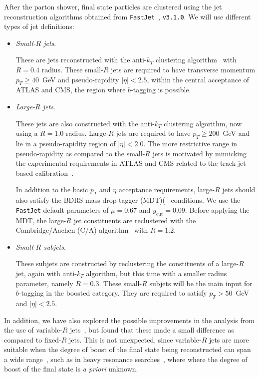 After the  parton shower, final state particles
are clustered using the
jet reconstruction algorithms
obtained from
{\tt FastJet}~\cite{Cacciari:2011ma,Cacciari:2005hq},
{\tt v3.1.0}.
%
We will use different types of jet definitions:
\begin{itemize}
\item {\it Small-$R$ jets}.

  These are jets  reconstructed with the
  anti-$k_T$ clustering algorithm~\cite{Cacciari:2008gp} with $R=0.4$ radius.
  These small-$R$ jets are required
  to have transverse momentum $p_T \ge 40$~GeV
  and pseudo-rapidity $|\eta|<2.5$, within the central 
  acceptance of ATLAS and CMS, the region
  where $b$-tagging is possible.

\item {\it Large-$R$ jets}.

  These jets are also constructed with the
  anti-$k_T$ clustering algorithm, now using a $R=1.0$ radius.
  Large-$R$ jets are required to have
  $p_T \ge 200$~GeV and lie in a pseudo-rapidity region of
  $|\eta|<2.0$.
  The more restrictive range  in pseudo-rapidity
  as compared to the small-$R$ jets
  is motivated by mimicking the  experimental requirements
  in ATLAS and CMS
  related to the track-jet based calibration~\cite{Aad:2014bia,ATLAS:2012kla}.

  In addition to the basic $p_T$ and $\eta$
  acceptance requirements, large-$R$ jets should also
  satisfy the  BDRS mass-drop tagger (MDT)(~\cite{Butterworth:2008iy}
  conditions.
  We use the {\tt FastJet} default
  parameters of  $\mu = 0.67$ and $y_{\textrm{cut}}= 0.09$.
  Before applying the MDT, the large-$R$ jet
  constituents are reclustered with the Cambridge/Aachen (C/A)
  algorithm~\cite{Dokshitzer:1997in,Wobisch:1998wt}
  with $R=1.2$.

  
\item {\it Small-$R$ subjets}.

  These subjets are constructed by reclustering the constituents
  of a large-$R$ jet, again with  anti-$k_T$ algorithm,
  but this time with a smaller radius parameter, namely
  $R=0.3$.
  These small-$R$ subjets will be the main input for
  $b$-tagging in the boosted category.
  They are required to satisfy $p_T > 50$~GeV and $|\eta|<2.5$.
\end{itemize}

In addition, we have
also explored the possible improvements
in the analysis from the use
of variable-$R$ jets~\cite{Krohn:2009zg}, but found that these made
a small difference as compared to fixed-$R$ jets.
%
This is not unexpected, since variable-$R$ jets are more suitable when
the degree of boost of the final state being reconstructed can span
a wide range~\cite{Cacciari:2008gd}, such as in heavy resonance searches~\cite{Aad:2015fna},
where where the degree of boost of the final state
is {\it a priori} unknown.


